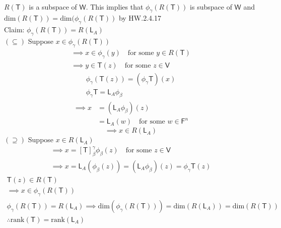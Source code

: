 \paragraph{} $R(\mathsf{T})$ is a subspace of $\mathsf{W}$. This
implies that $\phi_\gamma(R(\mathsf{T}))$ is subspace of $\mathsf{W}$
and $\text{dim}(R(\mathsf{T})) =
\text{dim}(\phi_\gamma(R(\mathsf{T}))$ by HW.2.4.17
\\Claim: $\phi_\gamma(R(\mathsf{T})) = R(\mathsf{L}_A)$
\\$(\subseteq)$ Suppose $x \in\phi_\gamma(R(\mathsf{T}))$
\begin{gather}
\implies x \in \phi_\gamma(y)\quad \text{for some } y \in
R(\mathsf{T})\\
\implies y \in \mathsf{T}(z)\quad \text{for some } z \in \mathsf{V}
\end{gather}
\begin{gather}
\phi_\gamma(\mathsf{T}(z)) = (\phi_\gamma\mathsf{T})(x)\\
\phi_\gamma\mathsf{T} = \mathsf{L}_A\phi_\beta
\end{gather}
\begin{align}
\implies x &= (\mathsf{L}_A\phi_\beta)(z)\\
&= \mathsf{L}_A(w)\quad \text{for some } w \in \mathsf{F}^n
\end{align}
\begin{equation}
\implies x \in R(\mathsf{L}_A)
\end{equation}
$(\supseteq)$ Suppose $x \in R(\mathsf{L}_A)$ 
\begin{gather}
\implies x = [\mathsf{T}]_\beta^\gamma\phi_\beta(z)\quad \text{for
  some } z \in \mathsf{V}\\
\implies x = \mathsf{L}_A(\phi_\beta(z)) = (\mathsf{L}_A\phi_\beta)(z)
= \phi_\gamma\mathsf{T}(z)
\end{gather}
\begin{gather}
\mathsf{T}(z) \in R(\mathsf{T})\\
\implies x \in \phi_\gamma(R(\mathsf{T}))\\
\phi_\gamma(R(\mathsf{T})) = R(\mathsf{L}_A) \implies
\text{dim}(\phi_\gamma(R(\mathsf{T}))) = \text{dim}(R(\mathsf{L}_A)) =
\text{dim}(R(\mathsf{T}))\\
\therefore \text{rank}(\mathsf{T}) = \text{rank}(\mathsf{L}_A)
\end{gather}
